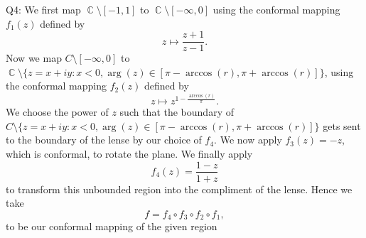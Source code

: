 \documentclass[letterpaper]{article}
\DeclareMathOperator{\C}{\mathbb{C}}
\begin{document}
\noindent Q4: We first map $\C \setminus [-1,1]$ to $\C \setminus [-\infty, 0]$ using the conformal mapping $f_1(z)$ defined by $$z \mapsto \frac{z+1}{z-1}.$$
Now we map $C\setminus [-\infty , 0]$ to $\C \setminus \{z= x+ iy : x<0, \arg(z) \in [\pi - \arccos(r), \pi + \arccos(r)] \}$, using the conformal mapping $f_2(z)$ defined by $$z \mapsto z^{1 - \frac{\arccos(r)}{\pi}}.$$
We choose the power of $z$ such that the boundary of $C \setminus \{z= x+ iy : x<0, \arg(z) \in [\pi - \arccos(r), \pi + \arccos(r)] \}$ gets sent to the boundary of the lense by our choice of $f_4$. 
We now apply $f_3(z) = -z$, which is conformal, to rotate the plane. We finally apply $$f_4(z) = \frac{1-z}{1+z}$$ to transform this unbounded region into the compliment of the lense. Hence we take $$f = f_4 \circ f_3 \circ f_2 \circ f_1,$$ to be our conformal mapping of the given region 
\end{document}
